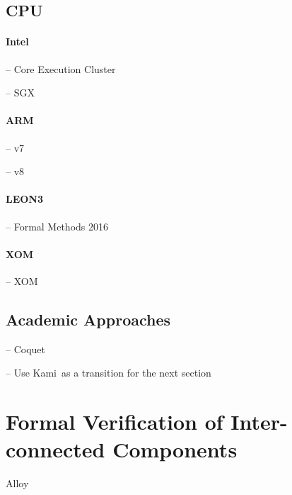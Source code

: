 \subsection{CPU}

\paragraph{Intel}
%
\begin{compactitem}
\item[--] Core Execution Cluster\,\cite{kaivola2009formalintel}
\item[--] SGX\,\cite{leslie2015sgx}
\end{compactitem}

\paragraph{ARM}
%
\begin{compactitem}
\item[--] v7\,\cite{fox2010armv7}
\item[--] v8\,\cite{reid2016armv8}
\end{compactitem}

\paragraph{LEON3}
%
\begin{compactitem}
\item[--] Formal Methods 2016
\end{compactitem}

\paragraph{XOM}
%
\begin{compactitem}
\item[--] XOM\,\cite{lie2003xom}
\end{compactitem}

\subsection{Academic Approaches} %

\begin{compactitem}
\item[--] Coquet\,\cite{braibant2011coquet}
\item[--] Use Kami\,\cite{choi2017kami} as a transition for the next section
\end{compactitem}

\section{Formal Verification of Inter-connected Components} %
\label{sec:relatedwork:modular}

\begin{compactitem}
\item Alloy\,\cite{jackson2012alloy}
\end{compactitem}
